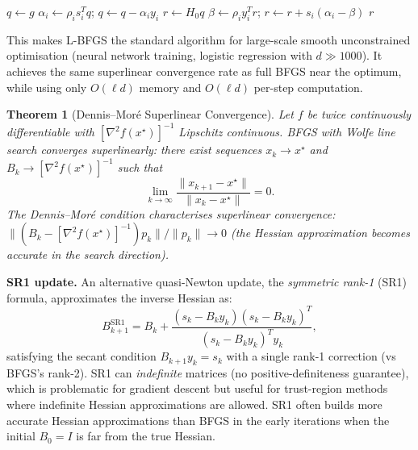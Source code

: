 \documentclass[11pt,a4paper]{article}
\newtheorem{theorem}{Theorem}[section]
\theoremstyle{definition}
\begin{document}
\begin{algorithmic}[1]
\State $q \gets g$ 
    \State $\alpha_i \gets \rho_i s_i^T q$; \quad $q \gets q - \alpha_i y_i$
\EndFor
\State $r \gets H_0 q$ 
 
    \State $\beta \gets \rho_i y_i^T r$; \quad $r \gets r + s_i(\alpha_i - \beta)$
\EndFor
\Return $r$ 
\end{algorithmic}

This makes L-BFGS the standard algorithm for large-scale smooth unconstrained optimisation (neural network training, logistic regression with $d \gg 1000$). It achieves the same superlinear convergence rate as full BFGS near the optimum, while using only $O(\ell d)$ memory and $O(\ell d)$ per-step computation.

\begin{theorem}[Dennis--Mor\'e Superlinear Convergence]
\label{thm:dennis_more}
Let $f$ be twice continuously differentiable with $[\nabla^2 f(x^{\star})]^{-1}$ Lipschitz continuous. BFGS with Wolfe line search converges superlinearly: there exist sequences $x_k \to x^{\star}$ and $B_k \to [\nabla^2 f(x^{\star})]^{-1}$ such that
\begin{equation}
\lim_{k \to \infty} \frac{\|x_{k+1} - x^{\star}\|}{\|x_k - x^{\star}\|} = 0.
\end{equation}
The Dennis--Mor\'e condition characterises superlinear convergence: $\|(B_k - [\nabla^2 f(x^{\star})]^{-1})p_k\| / \|p_k\| \to 0$ (the Hessian approximation becomes accurate in the search direction).
\end{theorem}

\noindent\textbf{SR1 update.} An alternative quasi-Newton update, the \emph{symmetric rank-1} (SR1) formula, approximates the inverse Hessian as:
\begin{equation}
B_{k+1}^{\text{SR1}} = B_k + \frac{(s_k - B_k y_k)(s_k - B_k y_k)^T}{(s_k - B_k y_k)^T y_k},
\label{eq:sr1}
\end{equation}
satisfying the secant condition $B_{k+1} y_k = s_k$ with a single rank-1 correction (vs BFGS's rank-2). SR1 can \emph{indefinite} matrices (no positive-definiteness guarantee), which is problematic for gradient descent but useful for trust-region methods where indefinite Hessian approximations are allowed. SR1 often builds more accurate Hessian approximations than BFGS in the early iterations when the initial $B_0 = I$ is far from the true Hessian.
\end{document}
